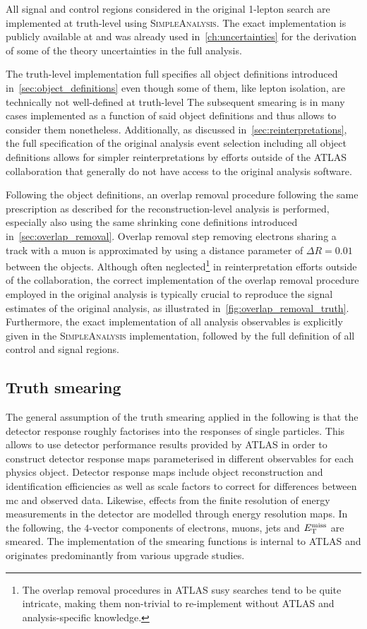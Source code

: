 All signal and control regions considered in the original 1-lepton search are implemented at truth-level using \textsc{SimpleAnalysis}. The exact implementation is publicly available at \cite{HEPdata_1Lbb} and was already used in~\cref{ch:uncertainties} for the derivation of some of the theory uncertainties in the full analysis.

The truth-level implementation full specifies all object definitions introduced in~\cref{sec:object_definitions} even though some of them, like \eg lepton isolation, are technically not well-defined at truth-level The subsequent smearing is in many cases implemented as a function of said object definitions and thus allows to consider them nonetheless. Additionally, as discussed in~\cref{sec:reinterpretations}, the full specification of the original analysis event selection including all object definitions allows for simpler reinterpretations by efforts outside of the ATLAS collaboration that generally do not have access to the original analysis software.

Following the object definitions, an overlap removal procedure following the same prescription as described for the reconstruction-level analysis is performed, \ie especially also using the same shrinking cone definitions introduced in~\cref{sec:overlap_removal}. Overlap removal step removing electrons sharing a track with a muon is approximated by using a distance parameter of $\Delta R = 0.01$ between the objects. Although often neglected\footnote{The overlap removal procedures in ATLAS \gls{susy} searches tend to be quite intricate, making them non-trivial to re-implement without ATLAS and analysis-specific knowledge.} in reinterpretation efforts outside of the collaboration, the correct implementation of the overlap removal procedure employed in the original analysis is typically crucial to reproduce the signal estimates of the original analysis, as illustrated in~\cref{fig:overlap_removal_truth}. Furthermore, the exact implementation of all analysis observables is explicitly given in the \textsc{SimpleAnalysis} implementation, followed by the full definition of all control and signal regions.

\subsection{Truth smearing}\label{sec:truth_smearing}

The general assumption of the truth smearing applied in the following is that the detector response roughly factorises into the responses of single particles. This allows to use detector performance results provided by ATLAS in order to construct detector response maps parameterised in different observables for each physics object. Detector response maps include object reconstruction and identification efficiencies as well as scale factors to correct for differences between \gls{mc} and observed data. Likewise, effects from the finite resolution of energy measurements in the detector are modelled through energy resolution maps. In the following, the 4-vector components of electrons, muons, jets and $E_{\textrm{T}}^{\textrm{miss}}$ are smeared. The implementation of the smearing functions is internal to ATLAS and originates predominantly from various upgrade studies.

